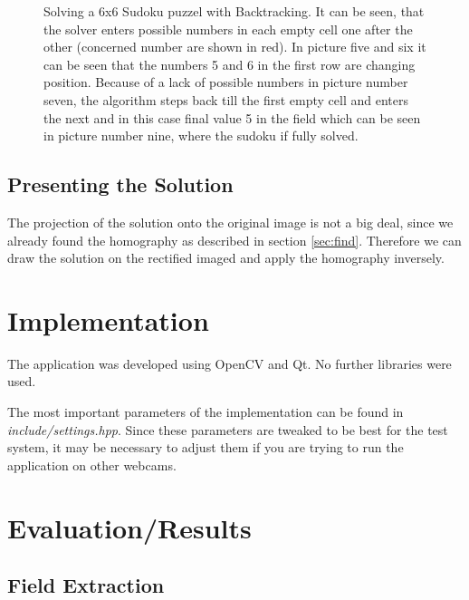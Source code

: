 \documentclass[
a4paper,     %
12pt         %
]{scrartcl}  %
\begin{document}
\begin{figure}[h!btp]
\begin{subfigure}[b]{\linewidth}
   \end{subfigure}
      \caption[Solving a 6x6 Sudoku puzzel with Backtracking]{\scriptsize{Solving a 6x6 Sudoku puzzel with Backtracking. 
        It can be seen, that the solver enters possible numbers in each empty cell one after the other 
        (concerned number are shown in red). In picture five and six it can be seen that the numbers 5 and 6 in the first row are 
        changing position. Because of a lack of possible numbers in picture number seven, the algorithm steps
        back till the first empty cell and enters the next and in this case final value 5 in the field which 
        can be seen in picture number nine, where the sudoku if fully solved.}}
   \label{fig:backtracking}
\end{figure} 

\subsection{Presenting the Solution}

The projection of the solution onto the original image is not a big deal, since we already
found the homography as described in section \ref{sec:find}. Therefore we can draw the solution
on the rectified imaged and apply the homography inversely.

\section{Implementation}

The application was developed using OpenCV and Qt. No further libraries were used.

The most important parameters of the implementation can be found in \emph{include/settings.hpp}.
Since these parameters are tweaked to be best for the test system, it may be necessary to
adjust them if you are trying to run the application on other webcams. 

\section{Evaluation/Results}
\label{sec:results}

\subsection{Field Extraction}
\end{document}
